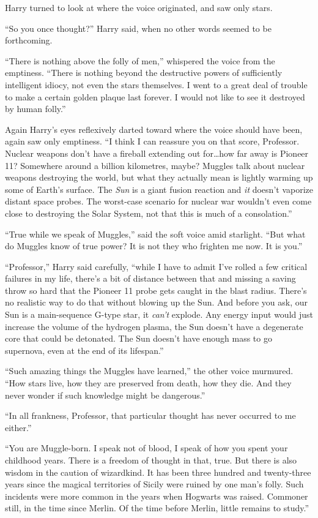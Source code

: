 Harry turned to look at where the voice originated, and saw only stars.

“So you once thought?” Harry said, when no other words seemed to be forthcoming.

“There is nothing above the folly of men,” whispered the voice from the emptiness. “There is nothing beyond the destructive powers of sufficiently intelligent idiocy, not even the stars themselves. I went to a great deal of trouble to make a certain golden plaque last forever. I would not like to see it destroyed by human folly.”

Again Harry’s eyes reflexively darted toward where the voice should have been, again saw only emptiness. “I think I can reassure you on that score, Professor. Nuclear weapons don’t have a fireball extending out for…how far away is Pioneer 11? Somewhere around a billion kilometres, maybe? Muggles talk about nuclear weapons destroying the world, but what they actually mean is lightly warming up some of Earth’s surface. The \emph{Sun} is a giant fusion reaction and \emph{it} doesn’t vaporize distant space probes. The worst-case scenario for nuclear war wouldn’t even come close to destroying the Solar System, not that this is much of a consolation.”

“True while we speak of Muggles,” said the soft voice amid starlight. “But what do Muggles know of true power? It is not they who frighten me now. It is you.”

“Professor,” Harry said carefully, “while I have to admit I’ve rolled a few critical failures in my life, there’s a bit of distance between that and missing a saving throw so hard that the Pioneer 11 probe gets caught in the blast radius. There’s no realistic way to do that without blowing up the Sun. And before you ask, our Sun is a main-sequence G-type star, it \emph{can’t} explode. Any energy input would just increase the volume of the hydrogen plasma, the Sun doesn’t have a degenerate core that could be detonated. The Sun doesn’t have enough mass to go supernova, even at the end of its lifespan.”

“Such amazing things the Muggles have learned,” the other voice murmured. “How stars live, how they are preserved from death, how they die. And they never wonder if such knowledge might be dangerous.”

“In all frankness, Professor, that particular thought has never occurred to me either.”

“You are Muggle-born. I speak not of blood, I speak of how you spent your childhood years. There is a freedom of thought in that, true. But there is also wisdom in the caution of wizardkind. It has been three hundred and twenty-three years since the magical territories of Sicily were ruined by one man’s folly. Such incidents were more common in the years when Hogwarts was raised. Commoner still, in the time since Merlin. Of the time before Merlin, little remains to study.”


